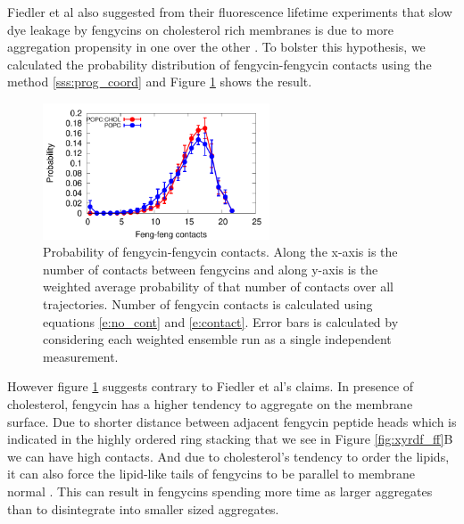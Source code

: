 Fiedler et al also suggested from their fluorescence lifetime experiments that
 slow dye leakage by fengycins on cholesterol rich membranes is due to  more 
aggregation propensity in one over the other \cite{Heerklotz2015}. To bolster this hypothesis, we 
calculated the probability distribution of fengycin-fengycin contacts using the 
method \ref{sss:prog_coord} and Figure \ref{f:cont_prob} shows the result.
\begin{figure}[h!]
\centering
\includegraphics[width=0.6\textwidth]{chapter3_figs/popcchol_pdist_prob.pdf}
\caption{Probability of fengycin-fengycin contacts. Along the x-axis is the number of contacts between fengycins and along y-axis is the weighted average probability of that number of contacts over all trajectories. Number of fengycin contacts is calculated using equations \ref{e:no_cont} and \ref{e:contact}. Error bars is calculated by considering each weighted ensemble run as a single independent measurement.}
\label{f:cont_prob}
\end{figure}
However figure \ref{f:cont_prob} suggests contrary to Fiedler et al's claims. 
In presence of cholesterol, fengycin has a higher tendency to aggregate on 
the membrane surface. 
Due to shorter distance between adjacent fengycin peptide heads which is indicated in the highly ordered ring stacking that we see in Figure \ref{fig:xyrdf_ff}B we can have high contacts.
And due to cholesterol's tendency to order the lipids, it can also force the lipid-like tails of fengycins to be parallel to membrane normal . This can result in fengycins spending more time as larger aggregates  than to disintegrate into smaller sized aggregates.


